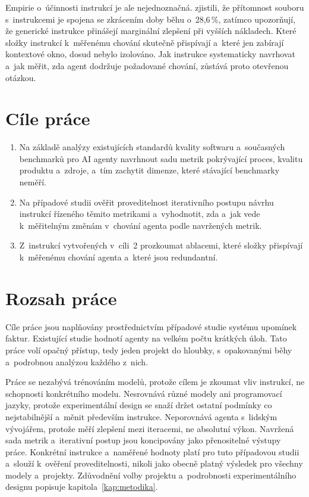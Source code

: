 Empirie o~účinnosti instrukcí je ale nejednoznačná. \textcite{lulla2026}
zjistili, že přítomnost souboru s~instrukcemi je spojena se zkrácením
doby běhu o~28,6\,\%, zatímco \textcite{gloaguen2025agentsmd}
upozorňují, že generické instrukce
přinášejí marginální zlepšení při vyšších nákladech. Které složky
instrukcí k~měřenému chování skutečně přispívají a~které jen zabírají
kontextové okno, dosud nebylo izolováno. Jak instrukce systematicky
navrhovat a~jak měřit, zda agent dodržuje požadované chování,
zůstává proto otevřenou otázkou.

\section{Cíle práce}

\begin{enumerate}
    \item Na základě analýzy existujících standardů kvality softwaru
          a~současných benchmarků pro AI agenty navrhnout sadu metrik
          pokrývající proces, kvalitu produktu a~zdroje, a~tím zachytit
          dimenze, které stávající benchmarky neměří.
    \item Na případové studii ověřit proveditelnost iterativního
          postupu návrhu instrukcí řízeného těmito metrikami
          a~vyhodnotit, zda a~jak vede k~měřitelným změnám v~chování
          agenta podle navržených metrik.
    \item Z~instrukcí vytvořených v~cíli~2 prozkoumat ablacemi, které
          složky přispívají k~měřenému chování agenta a~které jsou
          redundantní.
\end{enumerate}

\section{Rozsah práce}

Cíle práce jsou naplňovány prostřednictvím případové studie systému
upomínek faktur.
Existující studie hodnotí agenty na velkém počtu krátkých úloh.
Tato práce volí opačný přístup, tedy jeden projekt do hloubky,
s~opakovanými běhy a~podrobnou analýzou každého z~nich.

Práce se nezabývá trénováním modelů, protože cílem je zkoumat
vliv instrukcí, ne schopnosti konkrétního modelu. Nesrovnává různé
modely ani programovací jazyky, protože experimentální design se snaží
držet ostatní podmínky co nejstabilnější a~měnit především instrukce.
Neporovnává agenta s~lidským vývojářem, protože
měří zlepšení mezi iteracemi, ne absolutní výkon. Navržená sada
metrik a~iterativní postup jsou koncipovány jako přenositelné výstupy práce.
Konkrétní instrukce a~naměřené hodnoty platí pro tuto případovou studii
a~slouží k~ověření proveditelnosti, nikoli jako obecně platný
výsledek pro všechny modely a~projekty.
Zdůvodnění volby projektu a~podrobnosti experimentálního designu
popisuje kapitola~\ref{kap:metodika}.
